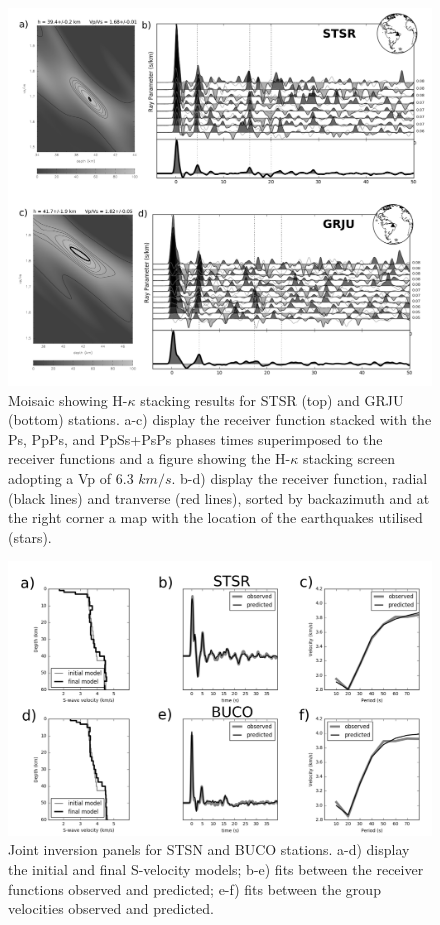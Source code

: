 \documentclass[paper,11pt]{geophysics}
\begin{document}
\begin{figure}[!ht]
\begin{center}
\includegraphics[width=\textwidth]{Fig/mosaico_GRJU_STSR.png}
\caption{Moisaic showing H-$\kappa$ stacking results for STSR (top) and GRJU (bottom) stations. a-c) display the receiver function stacked with the Ps, PpPs, and PpSs+PsPs phases times superimposed to the receiver functions and a figure showing the H-$\kappa$ stacking screen adopting a Vp of 6.3 $km/s$. b-d) display the receiver function, radial (black lines) and tranverse (red lines), sorted by backazimuth and at the right corner a map with the location of the earthquakes utilised (stars).}
\label{moisaic_FR}
\end{center}
\end{figure}

\pagebreak

\begin{figure}[!ht]
\begin{center}
\includegraphics[width=\textwidth]{Fig/joint_inversion_results.png}
\caption{Joint inversion panels for STSN and BUCO stations. a-d) display the initial and final S-velocity models; b-e) fits between the receiver
functions observed and predicted; e-f) fits between the group velocities observed and predicted.}
\label{joint_inversion}
\end{center}
\end{figure}
\end{document}
